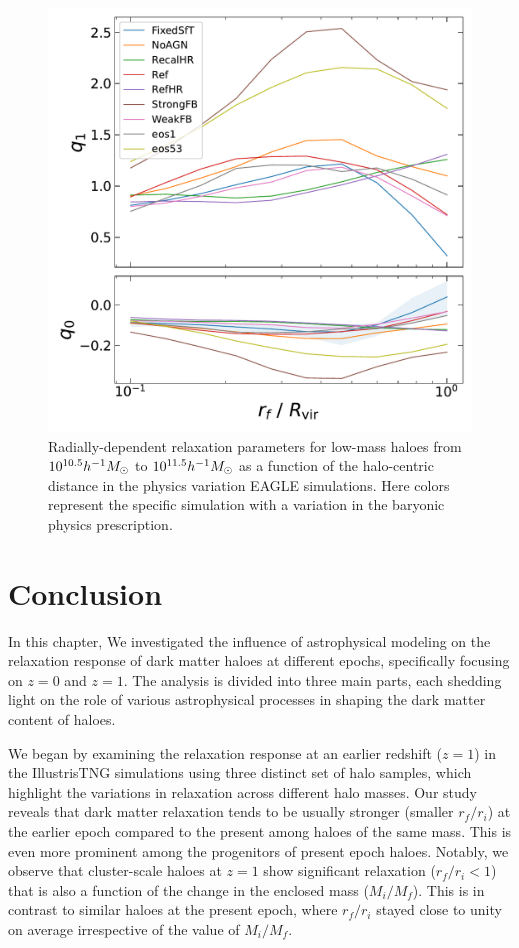 \begin{figure}[htbp]
\centering
\includegraphics[width=0.7\linewidth]{plots/fit_params_rf_M_E_physvar_fatmass_uniradb.pdf}
\caption[]{Radially-dependent relaxation parameters for low-mass haloes from $10^{10.5} h^{-1}M_{\odot}$ to $10^{11.5} h^{-1}M_{\odot}$ as a function of the halo-centric distance in the physics variation EAGLE simulations. Here colors represent the specific simulation with a variation in the baryonic physics prescription.}
\label{fig:EAGLE-rad-dep}
\end{figure}


\section{Conclusion}
\label{sec:conclusion-ch:physvar}

In this chapter, We investigated the influence of astrophysical modeling on the relaxation response of dark matter haloes at different epochs, specifically focusing on \( z=0 \) and \( z=1 \). The analysis is divided into three main parts, each shedding light on the role of various astrophysical processes in shaping the dark matter content of haloes.

We began by examining the relaxation response at an earlier redshift (\( z=1 \)) in the IllustrisTNG simulations using three distinct set of halo samples, which highlight the variations in relaxation across different halo masses. Our study reveals that dark matter relaxation tends to be usually stronger (smaller \(r_f/r_i\)) at the earlier epoch compared to the present among haloes of the same mass. This is even more prominent among the progenitors of present epoch haloes. Notably, we observe that cluster-scale haloes at \( z=1 \) show significant relaxation (\(r_f/r_i<1\)) that is also a function of the change in the enclosed mass (\(M_i/M_f\)). This is in contrast to similar haloes at the present epoch, where \(r_f/r_i\) stayed close to unity on average irrespective of the value of \(M_i/M_f\).


